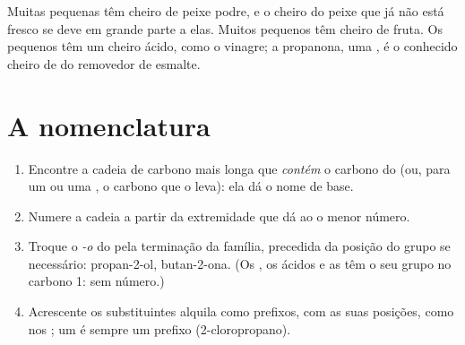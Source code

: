 \begin{remark}\label{rem:g11:functional-groups:smells}
Muitas  pequenas têm cheiro de peixe podre, e o cheiro do peixe
que já não está fresco se deve em grande parte a elas. Muitos 
pequenos têm cheiro de fruta. Os  pequenos têm um
cheiro ácido, como o vinagre; a propanona, uma , é o conhecido
cheiro de  do removedor de esmalte.
\end{remark}

\section{A nomenclatura}

\begin{method}\label{met:g11:functional-groups:naming}
\begin{enumerate}
  \item Encontre a cadeia de carbono mais longa que \emph{contém} o
        carbono do  (ou, para um  ou uma , o
        carbono que o leva): ela dá o nome de base.
  \item Numere a cadeia a partir da extremidade que dá ao 
        o menor número.
  \item Troque o \emph{-o} do  pela terminação da família,
        precedida da posição do grupo se necessário: propan-2-ol,
        butan-2-ona. (Os , os ácidos e as  têm o seu grupo
        no carbono 1: sem número.)
  \item Acrescente os substituintes alquila como prefixos, com as suas
        posições, como nos ; um  é sempre um prefixo
        (2-cloropropano).
\end{enumerate}
\end{method}

